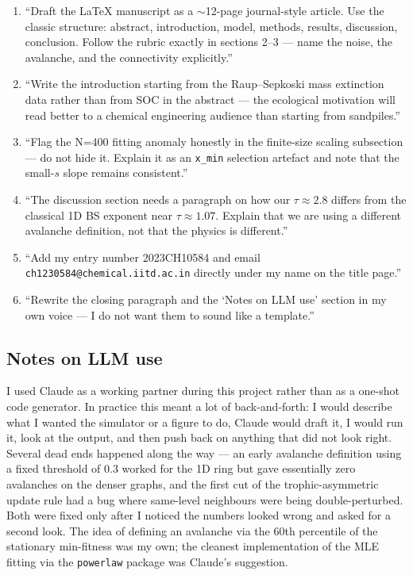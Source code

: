 \documentclass[11pt,a4paper]{article}
\begin{document}
\begin{enumerate}
\subsection*{Phase 6: Manuscript and polish}
\item ``Draft the LaTeX manuscript as a $\sim$12-page journal-style article. Use the classic structure: abstract, introduction, model, methods, results, discussion, conclusion. Follow the rubric exactly in sections 2--3 --- name the noise, the avalanche, and the connectivity explicitly.''
\item ``Write the introduction starting from the Raup--Sepkoski mass extinction data rather than from SOC in the abstract --- the ecological motivation will read better to a chemical engineering audience than starting from sandpiles.''
\item ``Flag the N=400 fitting anomaly honestly in the finite-size scaling subsection --- do not hide it. Explain it as an \texttt{x\_min} selection artefact and note that the small-$s$ slope remains consistent.''
\item ``The discussion section needs a paragraph on how our $\tau \approx 2.8$ differs from the classical 1D BS exponent near $\tau \approx 1.07$. Explain that we are using a different avalanche definition, not that the physics is different.''
\item ``Add my entry number 2023CH10584 and email \texttt{ch1230584@chemical.iitd.ac.in} directly under my name on the title page.''
\item ``Rewrite the closing paragraph and the `Notes on LLM use' section in my own voice --- I do not want them to sound like a template.''
\end{enumerate}

\subsection*{Notes on LLM use}
I used Claude as a working partner during this project rather than as a one-shot code generator. In practice this meant a lot of back-and-forth: I would describe what I wanted the simulator or a figure to do, Claude would draft it, I would run it, look at the output, and then push back on anything that did not look right. Several dead ends happened along the way --- an early avalanche definition using a fixed threshold of 0.3 worked for the 1D ring but gave essentially zero avalanches on the denser graphs, and the first cut of the trophic-asymmetric update rule had a bug where same-level neighbours were being double-perturbed. Both were fixed only after I noticed the numbers looked wrong and asked for a second look. The idea of defining an avalanche via the 60th percentile of the stationary min-fitness was my own; the cleanest implementation of the MLE fitting via the \texttt{powerlaw} package was Claude's suggestion.
\end{document}
